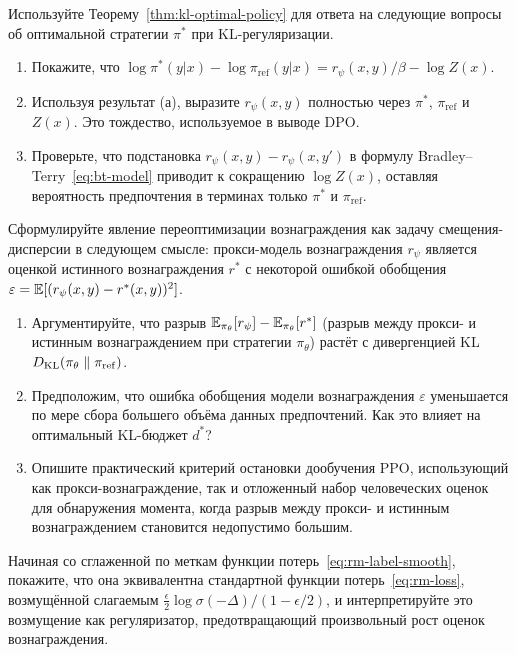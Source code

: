\begin{exercise}
\label{ex:kl-optimal-policy}
Используйте Теорему~\ref{thm:kl-optimal-policy} для ответа на следующие вопросы об оптимальной стратегии $\pi^*$ при KL-регуляризации.
\begin{enumerate}
  \item Покажите, что $\log\pi^*(y|x) - \log\pi_{\mathrm{ref}}(y|x) = r_\psi(x,y)/\beta - \log Z(x)$.
  \item Используя результат (а), выразите $r_\psi(x,y)$ полностью через $\pi^*$, $\pi_{\mathrm{ref}}$ и $Z(x)$. Это тождество, используемое в выводе DPO.
  \item Проверьте, что подстановка $r_\psi(x,y) - r_\psi(x,y')$ в формулу Bradley--Terry~\eqref{eq:bt-model} приводит к сокращению $\log Z(x)$, оставляя вероятность предпочтения в терминах только $\pi^*$ и $\pi_{\mathrm{ref}}$.
\end{enumerate}
\end{exercise}

\begin{exercise}
\label{ex:goodhart}
Сформулируйте явление переоптимизации вознаграждения как задачу смещения-дисперсии в следующем смысле: прокси-модель вознаграждения $r_\psi$ является оценкой истинного вознаграждения $r^*$ с некоторой ошибкой обобщения $\varepsilon = \operatorname{\mathbb{E}}[(r_\psi(x,y) - r^*(x,y))^2]$.
\begin{enumerate}
  \item Аргументируйте, что разрыв $\operatorname{\mathbb{E}}_{\pi_\theta}[r_\psi] - \operatorname{\mathbb{E}}_{\pi_\theta}[r^*]$ (разрыв между прокси- и истинным вознаграждением при стратегии $\pi_\theta$) растёт с дивергенцией KL $D_{\mathrm{KL}}\!\left(\pi_\theta\;\|\;\pi_{\mathrm{ref}}\right)$.
  \item Предположим, что ошибка обобщения модели вознаграждения $\varepsilon$ уменьшается по мере сбора большего объёма данных предпочтений. Как это влияет на оптимальный KL-бюджет $d^*$?
  \item Опишите практический критерий остановки дообучения PPO, использующий как прокси-вознаграждение, так и отложенный набор человеческих оценок для обнаружения момента, когда разрыв между прокси- и истинным вознаграждением становится недопустимо большим.
\end{enumerate}
\end{exercise}

\begin{exercise}
\label{ex:label-smoothing}
Начиная со сглаженной по меткам функции потерь~\eqref{eq:rm-label-smooth}, покажите, что она эквивалентна стандартной функции потерь~\eqref{eq:rm-loss}, возмущённой слагаемым $\frac{\epsilon}{2}\log\sigma(-\Delta)/(1-\epsilon/2)$, и интерпретируйте это возмущение как регуляризатор, предотвращающий произвольный рост оценок вознаграждения.
\end{exercise}

